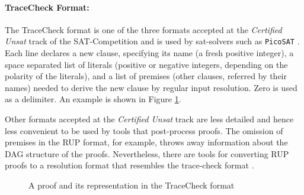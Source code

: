 \documentclass{llncs}
\begin{document}
\paragraph{TraceCheck Format: }

The TraceCheck \cite{tracecheck} format is one of the three formats accepted at the \emph{Certified Unsat} track of the SAT-Competition and is used by sat-solvers such as \texttt{PicoSAT} \cite{Biere_picosatessentials}. Each line declares a new clause, specifying its name (a fresh positive integer), a space separated list of literals (positive or negative integers, depending on the polarity of the literals), and a list of premises (other clauses, referred by their names) needed to derive the new clause by regular input resolution. Zero is used as a delimiter. An example is shown in Figure \ref{TraceCheckProof}.

Other formats accepted at the \emph{Certified Unsat} track are less detailed and hence less convenient to be used by tools that post-process proofs. The omission of premises in the RUP format, for example, throws away information about the DAG structure of the proofs. Nevertheless, there are tools for converting RUP proofs to a resolution format that resembles the trace-check format \cite{van2008verifying}.


\begin{figure}[h]
	\caption{A proof and its representation in the TraceCheck format}
	\label{TraceCheckProof}
\end{figure}
\end{document}
